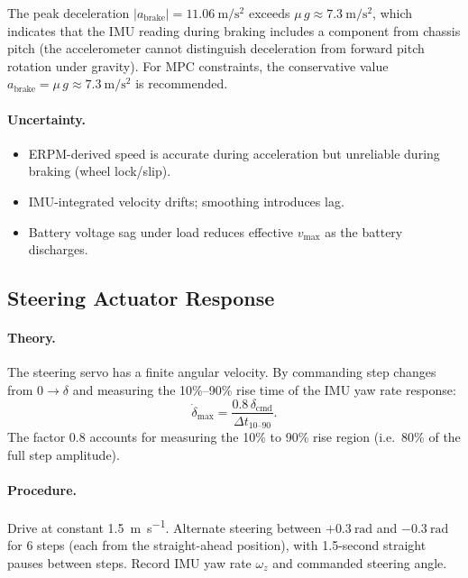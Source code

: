 \documentclass[11pt,a4paper]{article}
\begin{document}
The peak deceleration $|a_\text{brake}| = \SI{11.06}{\metre\per\second\squared}$
exceeds $\mu\,g \approx \SI{7.3}{\metre\per\second\squared}$, which
indicates that the IMU reading during braking includes a component from
chassis pitch (the accelerometer cannot distinguish deceleration from
forward pitch rotation under gravity).  For MPC constraints, the
conservative value $a_\text{brake} = \mu\,g \approx
\SI{7.3}{\metre\per\second\squared}$ is recommended.

\paragraph{Uncertainty.}
\begin{itemize}
  \item ERPM-derived speed is accurate during acceleration but unreliable
        during braking (wheel lock/slip).
  \item IMU-integrated velocity drifts; smoothing introduces lag.
  \item Battery voltage sag under load reduces effective $v_\text{max}$
        as the battery discharges.
\end{itemize}

\subsection{Steering Actuator Response}\label{sec:steering-rate}

\paragraph{Theory.}
The steering servo has a finite angular velocity. By commanding step
changes from $0 \to \delta$ and measuring the 10\%--90\% rise time
of the IMU yaw rate response:
\begin{equation}\label{eq:steer-rate}
  \dot{\delta}_\text{max} = \frac{0.8\,\delta_\text{cmd}}
                                 {\Delta t_{10\text{--}90}}.
\end{equation}
The factor 0.8 accounts for measuring the 10\% to 90\% rise region
(i.e.\ 80\% of the full step amplitude).

\paragraph{Procedure.}
Drive at constant \SI{1.5}{\metre\per\second}. Alternate steering
between $+\SI{0.3}{\radian}$ and $-\SI{0.3}{\radian}$ for 6
steps (each from the straight-ahead position),
with 1.5-second straight pauses between steps.
Record IMU yaw rate $\omega_z$ and commanded steering angle.
\end{document}
